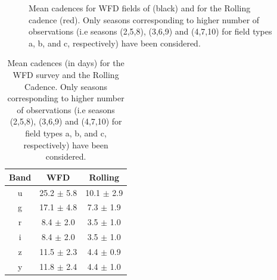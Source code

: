 \documentclass[\docopts]{\docclass}
\begin{document}
\begin{figure}[t]
\begin{center}
\caption{Mean cadences for WFD fields of  (black)
  and for the Rolling cadence (red). Only seasons corresponding to
  higher number of observations (i.e seasons (2,5,8), (3,6,9) and
  (4,7,10) for field types a, b, and c, respectively) have been considered.}
\label{fig:rolling_cadence_filtre}
\end{center}
\end{figure}


\begin{table}[t]
\begin{center}
\caption{Mean cadences (in days)  for the WFD survey and the Rolling
  Cadence. Only seasons corresponding to
  higher number of observations (i.e seasons (2,5,8), (3,6,9) and
  (4,7,10) for field types a, b, and c, respectively) have been considered. }
\label{tab:cadence_bands}
\begin{tabular}{c|c|c}
\hline
\hline
   Band  & WFD   &      Rolling \\
\hline
     u   & 25.2 $\pm$ 5.8 & 10.1 $\pm$ 2.9\\
     g   &  17.1 $\pm$ 4.8& 7.3 $\pm$ 1.9 \\
     r   &8.4 $\pm$ 2.0 & 3.5 $\pm$ 1.0 \\
     i   &8.4 $\pm$ 2.0  & 3.5 $\pm$ 1.0\\
     z  & 11.5 $\pm$ 2.3 & 4.4 $\pm$ 0.9\\
    y  & 11.8 $\pm$ 2.4& 4.4 $\pm$ 1.0\\
\hline
\end{tabular}
\end{center}
\end{table}
\end{document}
